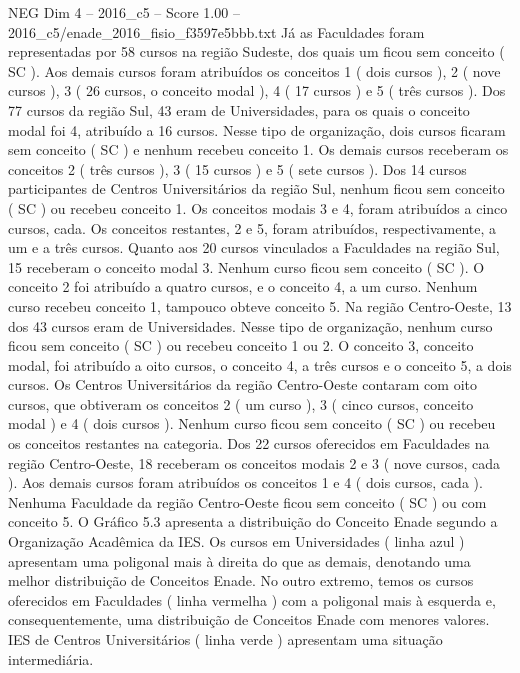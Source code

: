 \begin{textsample}{NEG Dim 4 – 2016\_c5 – Score 1.00 – 2016\_c5/enade\_2016\_fisio\_f3597e5bbb.txt}
Já as Faculdades foram representadas por 58 cursos na região Sudeste, dos quais um ficou sem conceito ( SC ).
Aos demais cursos foram atribuídos os conceitos 1 ( dois cursos ), 2 ( nove cursos ), 3 ( 26 cursos, o conceito modal ), 4 ( 17 cursos ) e 5 ( três cursos ).
Dos 77 cursos da região Sul, 43 eram de Universidades, para os quais o conceito modal foi 4, atribuído a 16 cursos.
Nesse tipo de organização, dois cursos ficaram sem conceito ( SC ) e nenhum recebeu conceito 1.
Os demais cursos receberam os conceitos 2 ( três cursos ), 3 ( 15 cursos ) e 5 ( sete cursos ).
Dos 14 cursos participantes de Centros Universitários da região Sul, nenhum ficou sem conceito ( SC ) ou recebeu conceito 1.
Os conceitos modais 3 e 4, foram atribuídos a cinco cursos, cada.
Os conceitos restantes, 2 e 5, foram atribuídos, respectivamente, a um e a três cursos.
Quanto aos 20 cursos vinculados a Faculdades na região Sul, 15 receberam o conceito modal 3.
Nenhum curso ficou sem conceito ( SC ).
O conceito 2 foi atribuído a quatro cursos, e o conceito 4, a um curso.
Nenhum curso recebeu conceito 1, tampouco obteve conceito 5.
Na região Centro-Oeste, 13 dos 43 cursos eram de Universidades.
Nesse tipo de organização, nenhum curso ficou sem conceito ( SC ) ou recebeu conceito 1 ou 2.
O conceito 3, conceito modal, foi atribuído a oito cursos, o conceito 4, a três cursos e o conceito 5, a dois cursos.
Os Centros Universitários da região Centro-Oeste contaram com oito cursos, que obtiveram os conceitos 2 ( um curso ), 3 ( cinco cursos, conceito modal ) e 4 ( dois cursos ).
Nenhum curso ficou sem conceito ( SC ) ou recebeu os conceitos restantes na categoria.
Dos 22 cursos oferecidos em Faculdades na região Centro-Oeste, 18 receberam os conceitos modais 2 e 3 ( nove cursos, cada ).
Aos demais cursos foram atribuídos os conceitos 1 e 4 ( dois cursos, cada ).
Nenhuma Faculdade da região Centro-Oeste ficou sem conceito ( SC ) ou com conceito 5.
O Gráfico 5.3 apresenta a distribuição do Conceito Enade segundo a Organização Acadêmica da IES.
Os cursos em Universidades ( linha azul ) apresentam uma poligonal mais à direita do que as demais, denotando uma melhor distribuição de Conceitos Enade.
No outro extremo, temos os cursos oferecidos em Faculdades ( linha vermelha ) com a poligonal mais à esquerda e, consequentemente, uma distribuição de Conceitos Enade com menores valores.
IES de Centros Universitários ( linha verde ) apresentam uma situação intermediária.

\end{textsample}
